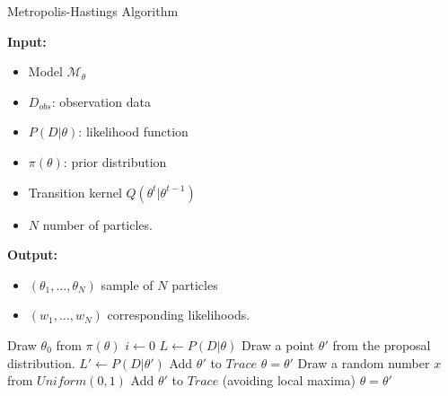 \begin{algorithm}[H]
    \caption{Metropolis-Hastings Algorithm}
    \label{alg:mh}
    \footnotesize{
        \hspace*{\algorithmicindent} \textbf{Input:}
        \begin{itemize}[noitemsep,topsep=0pt]
            \item Model $\mathcal{M}_\theta$
            \item $D_{obs}$: observation data
            \item $P(D|\theta)$: likelihood function
            \item $\pi(\theta)$: prior distribution
            \item Transition kernel $Q(\theta^t|\theta^{t-1})$
            \item $N$ number of particles.
        \end{itemize}
        \hspace*{\algorithmicindent} \textbf{Output:}
        \begin{itemize}[noitemsep]
            \item $(\theta_1,\ldots,\theta_N)$ sample of $N$ particles
            \item $(w_1,\ldots,w_N)$ corresponding likelihoods.
        \end{itemize}
    }
    \begin{algorithmic}[1]
        \State Draw $\theta_0$ from $\pi(\theta)$
        \State $i \leftarrow 0$
        \State $L \leftarrow P(D|\theta)$
        \State Draw a point $\theta' $ from the proposal distribution.
        \State $L' \leftarrow P(D|\theta')$
        \State Add $\theta'$ to $Trace$
        \State $\theta = \theta'$
        \Else
        \State Draw a random number $x$ from $Uniform(0,1)$
        \State Add $\theta'$ to $Trace$ (avoiding local maxima)
        \State $\theta = \theta'$
        \EndIf
        \EndIf
        \EndWhile
        \EndProcedure
    \end{algorithmic}
\end{algorithm}

